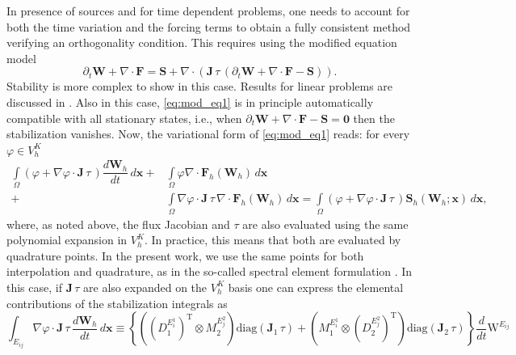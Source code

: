 \documentclass[a4paper,10pt]{article}
\begin{document}
In presence of sources and for time dependent problems, one needs to account for both the time variation and the forcing terms to
obtain a fully consistent method  verifying an   orthogonality condition. This   requires    using the modified equation model
\begin{equation}\label{eq:mod_eq1}
\partial_t\mathbf{W} + \nabla\cdot\mathbf{F} =  \mathbf{S} + \nabla\cdot\left( \mathbf{J} \,\tau\,  (\partial_t\mathbf{W}+ \nabla\cdot\mathbf{F}  -\mathbf{S})\right).
\end{equation}
Stability is more complex to show in this case. Results  for linear problems are discussed in \cite{BOCHEV20042301,burman1,barsukow2025stationaritypreservingnodalfinite}.
Also in this case, \eqref{eq:mod_eq1} is in principle automatically compatible with all stationary states, i.e., when $\partial_t\mathbf{W}+ \nabla\cdot\mathbf{F}  -\mathbf{S} = \mathbf{0}$ then the stabilization vanishes.
Now, the variational form of \eqref{eq:mod_eq1} reads: for every $\varphi \in V^K_h$
\begin{equation}\label{eq:weakSU0}
\begin{split}
\int\limits_{\Omega}(\varphi  +   \nabla \varphi\cdot \mathbf{J} \,\tau\,) \dfrac{d\mathbf{W}_h}{dt}\,d\mathbf{x}  + &
\int\limits_{\Omega}\varphi \nabla\cdot  \mathbf{F}_h(\mathbf{W}_h)\,d\mathbf{x} \\ +& 
\int\limits_{\Omega} \nabla \varphi\cdot \mathbf{J} \,\tau\, \nabla\cdot  \mathbf{F}_h(\mathbf{W}_h)\,d\mathbf{x} =
\int\limits_{\Omega}(\varphi  +  \nabla \varphi\cdot \mathbf{J} \,\tau \,)    \mathbf{S}_h(\mathbf{W}_h;\mathbf{x})\,d\mathbf{x},
\end{split}
\end{equation}
where, as noted above, the flux Jacobian and $\tau$ are   also evaluated using the same     polynomial expansion in $V_h^K$.  In practice, this means that
both  are  evaluated by quadrature points. In the present work, we use the same points for both interpolation and quadrature, as in the so-called spectral element formulation
\cite{sem-book}. 
In this case, 
if $ \mathbf{J} \,\tau$ are also expanded on the $V_h^K$ basis 
one can  express    the elemental contributions of the 
stabilization integrals as 
\begin{equation}\label{eq:su_local_1}
\int_{E_{ij}}  \nabla \varphi\cdot \mathbf{J} \,\tau\, \dfrac{d\mathbf{W}_h}{dt}\,d\mathbf{x} \equiv 
\left\{ \left((D_1^{E_i^{1}})^{\mathrm{T}}  \otimes M_2^{E_j^{2}} \right) \textrm{diag}(\mathbf{J}_1 \,\tau) 
+ \left(M_1^{E_i^{1}}\otimes  (D_2^{E_j^{2}})^{\mathrm{T}}\right) \textrm{diag}(\mathbf{J}_2 \,\tau)\right\} \dfrac{d }{dt} \mathrm{W}^{E_{ij}}
\end{equation}
\end{document}
